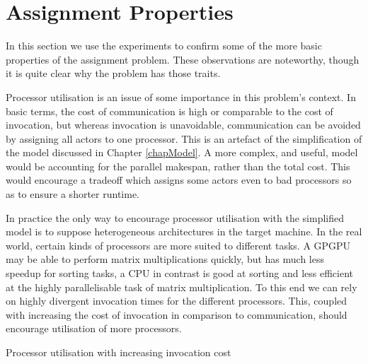 \section{Assignment Properties}

In this section we use the experiments to confirm some of the more basic properties of the assignment problem.
These observations are noteworthy, though it is quite clear why the problem has those traits.

Processor utilisation is an issue of some importance in this problem's context.
In basic terms, the cost of communication is high or comparable to the cost of invocation, but whereas invocation is unavoidable, communication can be avoided by assigning all actors to one processor.
This is an artefact of the simplification of the model discussed in Chapter \ref{chapModel}.
A more complex, and useful, model would be accounting for the parallel makespan, rather than the total cost.
This would encourage a tradeoff which assigns some actors even to bad processors so as to ensure a shorter runtime.

In practice the only way to encourage processor utilisation with the simplified model is to suppose heterogeneous architectures in the target machine.
In the real world, certain kinds of processors are more suited to different tasks.
A GPGPU may be able to perform matrix multiplications quickly, but has much less speedup for sorting tasks, a CPU in contrast is good at sorting and less efficient at the highly parallelisable task of matrix multiplication.
To this end we can rely on highly divergent invocation times for the different processors.
This, coupled with increasing the cost of invocation in comparison to communication, should encourage utilisation of more processors.

\begin{table}
\begin{center}
	
\caption{Processor utilisation with increasing invocation cost}
\label{figExScale}
\end{center}
\end{table}

